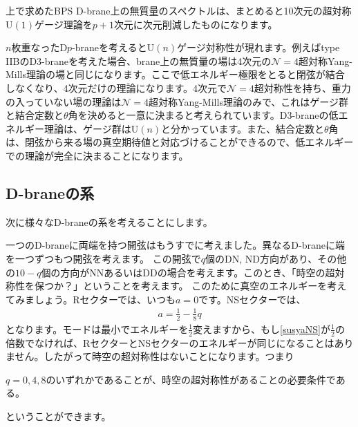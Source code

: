 \documentclass[report,paper=a4, fontsize=12pt, line_length=16cm, number_of_lines=34,dvipdfmx]{jlreq}
\newenvironment{important}{\begin{tcolorbox}[
  colback = white,
  colframe = red!35,
  boxrule = 2mm,
  fonttitle = \bfseries,
  after = \noindent] }{\end{tcolorbox}}
\numberwithin{equation}{chapter}
\numberwithin{equation}{section}
\begin{document}
上で求めたBPS D-brane上の無質量のスペクトルは、まとめると10次元の超対称U$(1)$ゲージ理論を$p+1$次元に次元削減したものになります。

$n$枚重なったD$p$-braneを考えるとU$(n)$ゲージ対称性が現れます。例えばtype IIBのD3-braneを考えた場合、brane上の無質量の場は4次元の$\mathcal{N}=4$超対称Yang-Mills理論の場と同じになります。ここで低エネルギー極限をとると閉弦が結合しなくなり、4次元だけの理論になります。4次元で$\mathcal{N}=4$超対称性を持ち、重力の入っていない場の理論は$\mathcal{N}=4$超対称Yang-Mills理論のみで、これはゲージ群と結合定数と$\theta$角を決めると一意に決まると考えられています。D3-braneの低エネルギー理論は、ゲージ群はU$(n)$と分かっています。また、結合定数と$\theta$角は、閉弦から来る場の真空期待値と対応づけることができるので、低エネルギーでの理論が完全に決まることになります。

\subsection{D-braneの系}

次に様々なD-braneの系を考えることにします。

一つのD-braneに両端を持つ開弦はもうすでに考えました。異なるD-braneに端を一つずつもつ開弦を考えます。
この開弦で$q$個のDN, ND方向があり、その他の$10-q$個の方向がNNあるいはDDの場合を考えます。このとき、「時空の超対称性を保つか？」ということを考えます。
このために真空のエネルギーを考えてみましょう。Rセクターでは、いつも$a=0$です。NSセクターでは、
\begin{align}
  a=\frac12-\frac18 q\label{susyaNS}
\end{align}
となります。モードは最小でエネルギーを$\frac12$変えますから、もし\eqref{susyaNS}が$\frac12$の倍数でなければ、RセクターとNSセクターのエネルギーが同じになることはありません。したがって時空の超対称性はないことになります。つまり
\begin{important}
  $q=0,4,8$のいずれかであることが、時空の超対称性があることの必要条件である。
\end{important}
ということができます。
\end{document}

